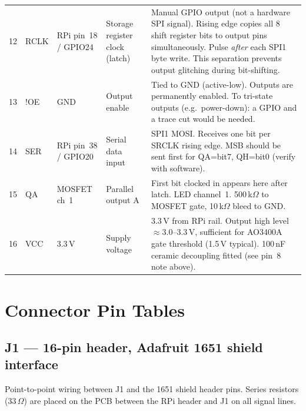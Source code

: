 \documentclass[11pt,a4paper]{article}
\begin{document}
\begin{longtable}{C{1.2cm} C{1.4cm} C{1.6cm} L{3.2cm} L{6.8cm}}
  12 & RCLK & RPi pin~18 / GPIO24 & Storage register clock (latch) &
    Manual GPIO output (not a hardware SPI signal).
    Rising edge copies all 8 shift register bits to output pins simultaneously.
    Pulse \emph{after} each SPI1 byte write.
    This separation prevents output glitching during bit-shifting. \\
  13 & !OE & GND & Output enable &
    Tied to GND (active-low). Outputs are permanently enabled.
    To tri-state outputs (e.g.\ power-down): a GPIO and a trace cut would be needed. \\
  14 & SER & RPi pin~38 / GPIO20 & Serial data input &
    SPI1 MOSI. Receives one bit per SRCLK rising edge.
    MSB should be sent first for QA=bit7, QH=bit0 (verify with software). \\
  15 & QA & MOSFET ch~1 & Parallel output A &
    First bit clocked in appears here after latch.
    LED channel~1.
    500\,k$\Omega$ to MOSFET gate, 10\,k$\Omega$ bleed to GND. \\
  16 & VCC & 3.3\,V & Supply voltage &
    3.3\,V from RPi rail. Output high level $\approx$3.0--3.3\,V,
    sufficient for AO3400A gate threshold (1.5\,V typical).
    100\,nF ceramic decoupling fitted (see pin~8 note above). \\

\end{longtable}

\section{Connector Pin Tables}
\label{sec:connectors}

\subsection{J1 --- 16-pin header, Adafruit 1651 shield interface}

Point-to-point wiring between J1 and the 1651 shield header pins.
Series resistors (33\,$\Omega$) are placed on the PCB between the RPi
header and J1 on all signal lines.
\end{document}
